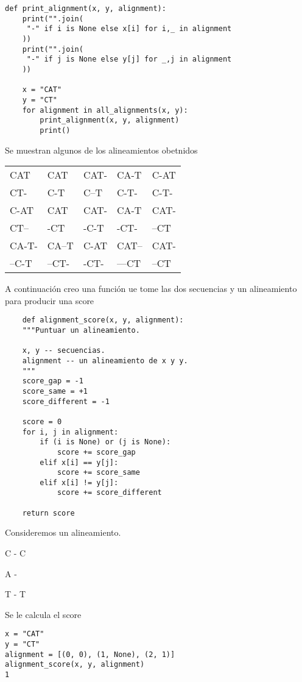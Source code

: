 \documentclass[usenatbib]{tjaa}
\begin{document}
\begin{verbatim}
def print_alignment(x, y, alignment):
    print("".join(
     "-" if i is None else x[i] for i,_ in alignment
    ))
    print("".join(
     "-" if j is None else y[j] for _,j in alignment
    ))

    x = "CAT"
    y = "CT"
    for alignment in all_alignments(x, y):
        print_alignment(x, y, alignment)
        print()
\end{verbatim}

Se muestran algunos de los alineamientos obetnidos

\begin{table}[h]
\begin{tabular}{lllll}
 CAT  & CAT  & CAT-  & CA-T   & C-AT   \\
 CT-  & C-T  & C--T  & C-T-   & C-T-   \\
 C-AT &CAT   & CAT-  & CA-T   &  CAT-  \\
 CT-- &-CT   & -C-T  & -CT-   & --CT   \\
 CA-T-&CA--T &  C-AT &  CAT-- & CAT-\\
 --C-T&--CT- &  -CT- &  ---CT & --CT  
\end{tabular}
\end{table}

A continuación creo una función ue tome las dos secuencias y un alineamiento para producir una score

\begin{verbatim}
    def alignment_score(x, y, alignment):
    """Puntuar un alineamiento.

    x, y -- secuencias.
    alignment -- un alineamiento de x y y.
    """
    score_gap = -1
    score_same = +1
    score_different = -1

    score = 0
    for i, j in alignment:
        if (i is None) or (j is None):
            score += score_gap
        elif x[i] == y[j]:
            score += score_same
        elif x[i] != y[j]:
            score += score_different

    return score
\end{verbatim}

Consideremos un alineamiento.

\vspace{1em}
C - C

A -

T - T
\vspace{1em}

Se le calcula el score

\begin{verbatim}
x = "CAT"
y = "CT"
alignment = [(0, 0), (1, None), (2, 1)]
alignment_score(x, y, alignment)
1
\end{verbatim}
\end{document}
